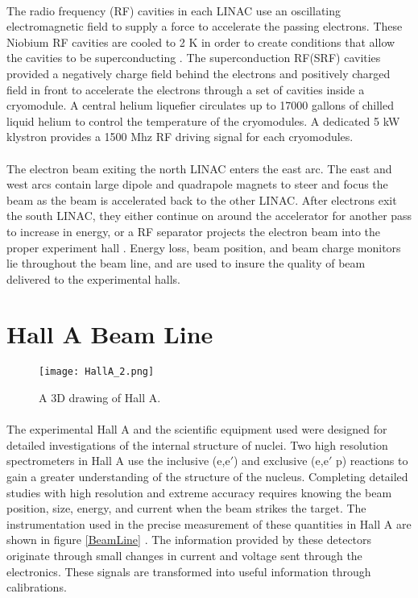 	\paragraph{}The radio frequency (RF) cavities in each LINAC use an oscillating electromagnetic field to supply a force to accelerate the passing electrons. These Niobium RF cavities are cooled to 2 K in order to create conditions that allow the cavities to be superconducting \cite{HallA}. The superconduction RF(SRF) cavities provided a negatively charge field behind the electrons and positively charged field in front to accelerate the electrons through a set of cavities inside a cryomodule. A central helium liquefier circulates up to 17000 gallons of chilled liquid helium to control the temperature of the cryomodules. A dedicated 5 kW klystron  provides a 1500 Mhz RF driving signal for each cryomodules. 
	\paragraph{} The electron beam exiting the north LINAC enters the east arc. The east and west arcs contain large dipole and quadrapole magnets to steer and focus the beam as the beam is accelerated back to the other LINAC. After electrons exit the south LINAC, they either continue on around the accelerator for another pass to increase in energy, or a RF separator projects the electron beam into the proper experiment hall \cite{CEBAF}. Energy loss, beam position, and beam charge monitors lie throughout the beam line, and are used to insure the quality of beam delivered to the experimental halls.

 \section{Hall A Beam Line}\label{sec:halla}
	 
	\begin{figure}[H]
		\centering
		\caption{A 3D drawing of Hall A. }
		\label{HallA}
		\texttt{[image: HallA\_2.png]} 
	\end{figure} 	 
	 
	 \paragraph{}The experimental Hall A and the scientific equipment used were designed for detailed investigations of the internal structure of nuclei. Two high resolution spectrometers in Hall A use the inclusive (e,e$\prime$) and exclusive (e,e$\prime$ p) reactions to gain a greater understanding of the structure of the nucleus. Completing detailed studies with high resolution and extreme accuracy requires knowing the beam position, size, energy, and current when the beam strikes the target. The instrumentation used in the precise measurement of these quantities in Hall A  are shown in figure \ref{BeamLine} \cite{HallA}. The information provided by these detectors originate through small changes in current and voltage sent through the electronics. These signals are transformed into useful information through calibrations.
 
